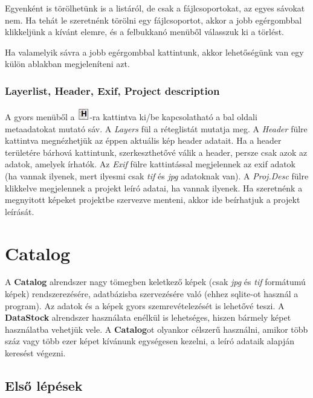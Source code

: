\documentclass[a4paper,12pt]{book}
\begin{document}
Egyenként is törölhetünk is a listáról, de csak a fájlcsoportokat, az egyes sávokat nem. Ha tehát le szeretnénk törölni egy fájlcsoportot, akkor a jobb egérgombbal klikkeljünk a kívánt elemre, és a felbukkanó menüből válasszuk ki a törlést.

Ha valamelyik sávra a jobb egérgombbal kattintunk, akkor lehetőségünk van egy külön ablakban megjeleníteni azt.

\subsection{Layerlist, Header, Exif, Project description}

A gyors menüből a \includegraphics[height=0.55cm]{headerikon}-ra kattintva ki/be kapcsolatható a bal oldali metaadatokat mutató sáv. A \textit{Layers} fül a réteglistát mutatja meg. A \textit{Header} fülre kattintva megnézhetjük az éppen aktuális kép header adatait. Ha a header területére bárhová kattintunk, szerkeszthetővé válik a header, persze csak azok az adatok, amelyek írhatók. Az \textit{Exif} fülre kattintással megjelennek az exif adatok (ha vannak ilyenek, mert ilyesmi csak \textit{tif} és \textit{jpg} adatoknak van). A \textit{Proj.Desc} fülre klikkelve megjelennek a projekt leíró adatai, ha vannak ilyenek. Ha szeretnénk a megnyitott képeket projektbe szervezve menteni, akkor ide beírhatjuk a projekt leírását.



\chapter{Catalog}

A \textbf{Catalog} alrendszer nagy tömegben keletkező képek (csak \textit{jpg} és \textit{tif} formátumú képek) rendszerezésére, adatbázisba szervezésére való (ehhez sqlite-ot használ a program). Az adatok és a képek gyors szemrevételezését is lehetővé teszi. A \textbf{DataStock} alrendszer használata enélkül is lehetséges, hiszen bármely képet használatba vehetjük vele. A \textbf{Catalog}ot olyankor célszerű használni, amikor több száz vagy több ezer képet kívánunk egységesen kezelni, a leíró adataik alapján keresést végezni.

\section{Első lépések}
\end{document}

